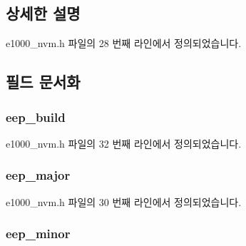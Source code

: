\subsection{상세한 설명}


e1000\+\_\+nvm.\+h 파일의 28 번째 라인에서 정의되었습니다.



\subsection{필드 문서화}
\subsubsection[{\texorpdfstring{eep\+\_\+build}{eep_build}}]{ eep\+\_\+build}\hypertarget{structe1000__fw__version_a78c491b19e35afae6fdac85b6d691de3}{}\label{structe1000__fw__version_a78c491b19e35afae6fdac85b6d691de3}


e1000\+\_\+nvm.\+h 파일의 32 번째 라인에서 정의되었습니다.

\subsubsection[{\texorpdfstring{eep\+\_\+major}{eep_major}}]{ eep\+\_\+major}\hypertarget{structe1000__fw__version_a74777043565bf2aae905b9f680d4cc3f}{}\label{structe1000__fw__version_a74777043565bf2aae905b9f680d4cc3f}


e1000\+\_\+nvm.\+h 파일의 30 번째 라인에서 정의되었습니다.

\subsubsection[{\texorpdfstring{eep\+\_\+minor}{eep_minor}}]{ eep\+\_\+minor}\hypertarget{structe1000__fw__version_aee00c21800209af164647f2061126ac8}{}\label{structe1000__fw__version_aee00c21800209af164647f2061126ac8}


